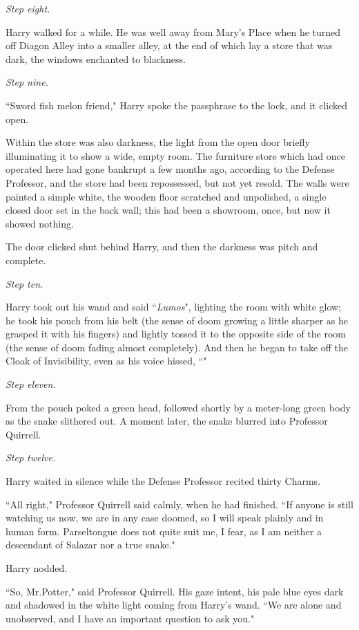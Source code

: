\emph{Step eight.}

Harry walked for a while. He was well away from Mary's Place when he turned off Diagon Alley into a smaller alley, at the end of which lay a store that was dark, the windows enchanted to blackness.

\emph{Step nine.}

``Sword fish melon friend," Harry spoke the passphrase to the lock, and it clicked open.

Within the store was also darkness, the light from the open door briefly illuminating it to show a wide, empty room. The furniture store which had once operated here had gone bankrupt a few months ago, according to the Defense Professor, and the store had been repossessed, but not yet resold. The walls were painted a simple white, the wooden floor scratched and unpolished, a single closed door set in the back wall; this had been a showroom, once, but now it showed nothing.

The door clicked shut behind Harry, and then the darkness was pitch and complete.

\emph{Step ten.}

Harry took out his wand and said ``\emph{Lumos}", lighting the room with white glow; he took his pouch from his belt (the sense of doom growing a little sharper as he grasped it with his fingers) and lightly tossed it to the opposite side of the room (the sense of doom fading almost completely). And then he began to take off the Cloak of Invisibility, even as his voice hissed, ``"

\emph{Step eleven.}

From the pouch poked a green head, followed shortly by a meter-long green body as the snake slithered out. A moment later, the snake blurred into Professor Quirrell.

\emph{Step twelve.}

Harry waited in silence while the Defense Professor recited thirty Charms.

``All right," Professor Quirrell said calmly, when he had finished. ``If anyone is still watching us now, we are in any case doomed, so I will speak plainly and in human form. Parseltongue does not quite suit me, I fear, as I am neither a descendant of Salazar nor a true snake."

Harry nodded.

``So, Mr.\?Potter," said Professor Quirrell. His gaze intent, his pale blue eyes dark and shadowed in the white light coming from Harry's wand. ``We are alone and unobserved, and I have an important question to ask you."

